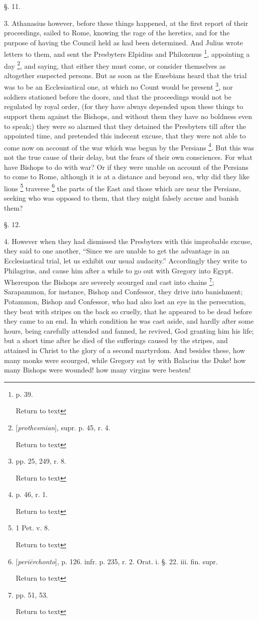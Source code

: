 §. 11.

3. Athanasius however, before these things
happened, at the first report of their proceedings, sailed to Rome,
knowing the rage of the heretics, and for the purpose of having the
Council held as had been determined. And Julius wrote letters to them,
and sent the Presbyters Elpidius and Philoxenus \footnote{p. 39.

Return to text}, appointing a day \footnote{[\emph{prothesmian}], supr. p. 45,
r. 4.

Return to text},
and saying, that either they must come, or consider themselves as
altogether suspected persons. But as soon as the Eusebians heard that
the trial was to be an Ecclesiastical one, at which no Count would be
present \footnote{pp. 25, 249, r. 8.

Return to text}, nor
soldiers stationed before the doors, and that the proceedings would
not be regulated by royal order, (for they have always depended upon
these things to support them against the Bishops, and without them
they have no boldness even to speak;) they were so alarmed that they
detained the Presbyters till after the appointed time, and pretended
this indecent excuse, that they were not able to come now on account
of the war which was begun by the Persians \footnote{p. 46, r. 1.

Return to text}. But this was not the true cause of their delay, but the fears
of their own consciences. For what have Bishops to do with war? Or if
they were unable on account of the Persians to come to Rome, although
it is at a distance and beyond sea, why did they like lions \footnote{1 Pet. v. 8.

Return to text} traverse \footnote{[\emph{peri\={e}rchonto}], p.
126. infr. p. 235, r. 2. Orat. i. §. 22. iii. fin. supr.

Return to text} the
parts of the East and those which are near the Persians, seeking who
was opposed to them, that they might falsely accuse and banish them?

§. 12.

4. However when they had dismissed the Presbyters
with this improbable excuse, they said to one another, ``Since we are
unable to get the advantage in an Ecclesiastical trial, let us
exhibit our usual audacity.'' Accordingly they write to Philagrius, and
cause him after a while to go out with Gregory into Egypt. Whereupon
the Bishops are severely scourged and cast into chains \footnote{pp. 51, 53.

Return to text}; Sarapammon, for instance, Bishop and Confessor, they drive
into banishment; Potammon, Bishop and Confessor, who had also lost an
eye in the persecution, they beat with stripes on the back so cruelly,
that he appeared to be dead before they came to an end. In which
condition he was cast aside, and hardly after some hours, being
carefully attended and fanned, he revived, God granting him his life;
but a short time after he died of the sufferings caused by the
stripes, and attained in Christ to the glory of a second martyrdom.
And besides these, how many monks were scourged, while Gregory sat by
with Balacius the Duke! how many Bishops were wounded! how many
virgins were beaten!

